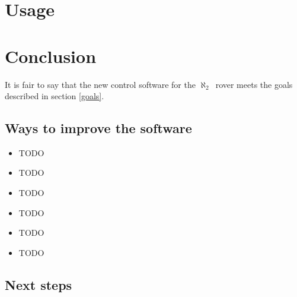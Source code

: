 \documentclass[english,inz,shortabstract]{iithesis}
\newcommand{\rovername}{$\aleph_2$\ }
\begin{document}
\chapter{Usage}

\chapter{Conclusion}
It is fair to say that the new control software for the \rovername rover meets the goals described in section \ref{goals}. 

\section{Ways to improve the software}

\begin{itemize}
	\item TODO %
	\item TODO %
	\item TODO %
	\item TODO %
	\item TODO %
	\item TODO %
\end{itemize}

\section{Next steps}



\end{document}
